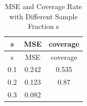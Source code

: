 \documentclass[]{article}
\begin{document}
\begin{longtable}[]{@{}ccc@{}}
\caption{MSE and Coverage Rate with Different Sample Fraction
s}\tabularnewline
\toprule
\begin{minipage}[b]{0.08\columnwidth}\centering\strut
s\strut
\end{minipage} & \begin{minipage}[b]{0.10\columnwidth}\centering\strut
MSE\strut
\end{minipage} & \begin{minipage}[b]{0.13\columnwidth}\centering\strut
coverage\strut
\end{minipage}\tabularnewline
\midrule
\endfirsthead
\toprule
\begin{minipage}[b]{0.08\columnwidth}\centering\strut
s\strut
\end{minipage} & \begin{minipage}[b]{0.10\columnwidth}\centering\strut
MSE\strut
\end{minipage} & \begin{minipage}[b]{0.13\columnwidth}\centering\strut
coverage\strut
\end{minipage}\tabularnewline
\midrule
\endhead
\begin{minipage}[t]{0.08\columnwidth}\centering\strut
0.1\strut
\end{minipage} & \begin{minipage}[t]{0.10\columnwidth}\centering\strut
0.242\strut
\end{minipage} & \begin{minipage}[t]{0.13\columnwidth}\centering\strut
0.535\strut
\end{minipage}\tabularnewline
\begin{minipage}[t]{0.08\columnwidth}\centering\strut
0.2\strut
\end{minipage} & \begin{minipage}[t]{0.10\columnwidth}\centering\strut
0.123\strut
\end{minipage} & \begin{minipage}[t]{0.13\columnwidth}\centering\strut
0.87\strut
\end{minipage}\tabularnewline
\begin{minipage}[t]{0.08\columnwidth}\centering\strut
0.3\strut
\end{minipage} & \begin{minipage}[t]{0.10\columnwidth}\centering\strut
0.082\strut
\end{minipage} & \begin{minipage}[t]{0.13\columnwidth}\centering\strut

\end{minipage}
\end{longtable}
\end{document}
